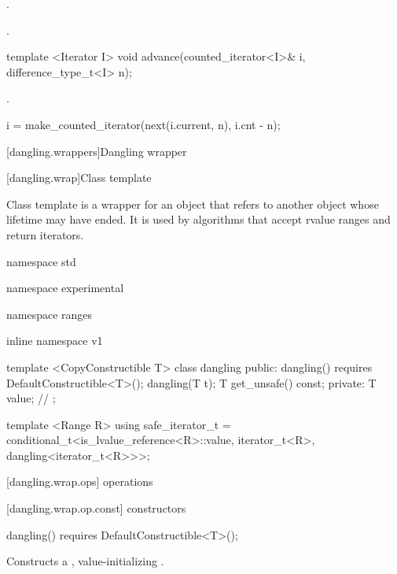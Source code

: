 \begin{itemdescr}
\pnum
\requires {}.

\pnum
\returns {}.
\end{itemdescr}

%
\begin{itemdecl}
template <Iterator I>
  void advance(counted_iterator<I>& i, difference_type_t<I> n);
\end{itemdecl}

\begin{itemdescr}
\pnum
\requires {}.

\pnum
\effects
\begin{codeblock}
i = make_counted_iterator(next(i.current, n), i.cnt - n);
\end{codeblock}
\end{itemdescr}

[dangling.wrappers]{Dangling wrapper}

[dangling.wrap]{Class template }

\pnum
{}%
Class template  is a wrapper for an object that refers to another object whose
lifetime may have ended. It is used by algorithms that accept rvalue ranges and return iterators.

\begin{codeblock}
namespace std { namespace experimental { namespace ranges { inline namespace v1 {
  template <CopyConstructible T>
  class dangling {
  public:
    dangling() requires DefaultConstructible<T>();
    dangling(T t);
    T get_unsafe() const;
  private:
    T value; // \expos
  };

  template <Range R>
  using safe_iterator_t =
    conditional_t<is_lvalue_reference<R>::value,
      iterator_t<R>,
      dangling<iterator_t<R>>>;
}}}}
\end{codeblock}

[dangling.wrap.ops]{ operations}

[dangling.wrap.op.const]{ constructors}

%
\begin{itemdecl}
dangling() requires DefaultConstructible<T>();
\end{itemdecl}

\begin{itemdescr}
\pnum
\effects Constructs a , value-initializing .
\end{itemdescr}

